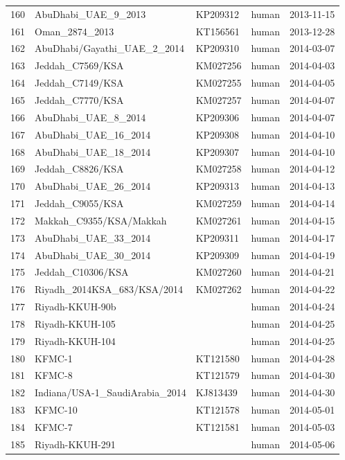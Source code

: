 \documentclass[11pt,oneside,letterpaper]{article}
\begin{document}
\begin{longtable}{ | r | l | p{2cm} | l | l | }
  160 & AbuDhabi\_UAE\_9\_2013 & KP209312 & human & 2013-11-15 \\
  161 & Oman\_2874\_2013 & KT156561 & human & 2013-12-28 \\
  162 & AbuDhabi/Gayathi\_UAE\_2\_2014 & KP209310 & human & 2014-03-07 \\
  163 & Jeddah\_C7569/KSA & KM027256 & human & 2014-04-03 \\
  164 & Jeddah\_C7149/KSA & KM027255 & human & 2014-04-05 \\
  165 & Jeddah\_C7770/KSA & KM027257 & human & 2014-04-07 \\
  166 & AbuDhabi\_UAE\_8\_2014 & KP209306 & human & 2014-04-07 \\
  167 & AbuDhabi\_UAE\_16\_2014 & KP209308 & human & 2014-04-10 \\
  168 & AbuDhabi\_UAE\_18\_2014 & KP209307 & human & 2014-04-10 \\
  169 & Jeddah\_C8826/KSA & KM027258 & human & 2014-04-12 \\
  170 & AbuDhabi\_UAE\_26\_2014 & KP209313 & human & 2014-04-13 \\
  171 & Jeddah\_C9055/KSA & KM027259 & human & 2014-04-14 \\
  172 & Makkah\_C9355/KSA/Makkah & KM027261 & human & 2014-04-15 \\
  173 & AbuDhabi\_UAE\_33\_2014 & KP209311 & human & 2014-04-17 \\
  174 & AbuDhabi\_UAE\_30\_2014 & KP209309 & human & 2014-04-19 \\
  175 & Jeddah\_C10306/KSA & KM027260 & human & 2014-04-21 \\
  176 & Riyadh\_2014KSA\_683/KSA/2014 & KM027262 & human & 2014-04-22 \\
  177 & Riyadh-KKUH-90b &  & human & 2014-04-24 \\
  178 & Riyadh-KKUH-105 &  & human & 2014-04-25 \\
  179 & Riyadh-KKUH-104 &  & human & 2014-04-25 \\
  180 & KFMC-1 & KT121580 & human & 2014-04-28 \\
  181 & KFMC-8 & KT121579 & human & 2014-04-30 \\
  182 & Indiana/USA-1\_SaudiArabia\_2014 & KJ813439 & human & 2014-04-30 \\
  183 & KFMC-10 & KT121578 & human & 2014-05-01 \\
  184 & KFMC-7 & KT121581 & human & 2014-05-03 \\
  185 & Riyadh-KKUH-291 &  & human & 2014-05-06 \\

\end{longtable}
\end{document}
